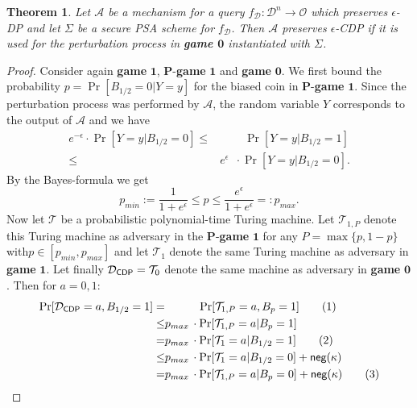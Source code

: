 \documentclass[10pt]{extarticle}
\newcommand\numberthis{\addtocounter{equation}{1}\tag{\theequation}}
\newtheorem{Thm}{Theorem}
\begin{document}
\begin{Thm}\label{cdptheorem} Let $\mathcal{A}$ be a mechanism for a query $f_{\mathcal{D}}:\mathcal{D}^n\to\mathcal{O}$ which preserves $\epsilon$-\mbox{\upshape\sffamily DP} and let $\Sigma$ be a secure PSA scheme for $f_{\mathcal{D}}$. Then $\mathcal{A}$ preserves $\epsilon$-\mbox{\upshape\sffamily CDP} if it is used for the perturbation process in \textbf{\upshape game $\boldsymbol 0$} instantiated with $\Sigma$.
\end{Thm}
\begin{proof} Consider again \textbf{game} $\boldsymbol 1$, $\boldsymbol P$-\textbf{game} $\boldsymbol 1$ and \textbf{game} $\boldsymbol 0$. We first bound the probability $p=\Pr[B_{1/2}=0| Y=y]$ for the biased coin in $\boldsymbol P$-\textbf{game} $\boldsymbol 1$. Since the perturbation process was performed by $\mathcal{A}$, the random variable $Y$ corresponds to the output of $\mathcal{A}$ and we have
\begin{align*} e^{-\epsilon}\cdot\Pr[Y=y| B_{1/2}=0]\leq & \phantom{e^{-\epsilon}\cdot}\,\Pr[Y=y| B_{1/2}=1]\\
\leq & e^\epsilon\,\,\,\cdot\Pr[Y=y| B_{1/2}=0].
\end{align*}
By the Bayes-formula we get
\[p_{min}:=\frac{1}{1+e^\epsilon}\leq p\leq\frac{e^\epsilon}{1+e^\epsilon}=:p_{max}.\]
Now let $\mathcal{T}$ be a probabilistic polynomial-time Turing machine. Let $\mathcal{T}_{1,P}$ denote this Turing machine as adversary in the $\boldsymbol P$-\textbf{game} $\boldsymbol 1$ for any $P=\max\{p,1-p\}$ with\linebreak $p\in[p_{min},p_{max}]$ and let $\mathcal{T}_1$ denote the same Turing machine as adversary in \textbf{game} $\boldsymbol 1$. Let finally $\mathcal{D}_{\mbox{\scriptsize\upshape\sffamily CDP}}=\mathcal{T}_0$ denote the same machine as adversary in \textbf{game} $\boldsymbol 0$. Then for $a=0,1$:
\begin{align*} \Pr[\mathcal{D}_{\mbox{\scriptsize\upshape\sffamily CDP}}=a, B_{1/2}=1]= & \phantom{p_{max}\cdot}\,\,\,\Pr[\mathcal{T}_{1,P}=a, B_p=1]\numberthis\label{eqcdp1}\\
 \leq & p_{max}\,\cdot\Pr[\mathcal{T}_{1,P}=a| B_p=1]\\
 = & p_{max}\,\cdot\Pr[\mathcal{T}_1=a| B_{1/2}=1]\numberthis\label{eqone1}\\
 \leq & p_{max}\,\cdot\Pr[\mathcal{T}_1=a| B_{1/2}=0]+\mbox{\upshape\sffamily neg}(\kappa)\\
 = & p_{max}\,\cdot\Pr[\mathcal{T}_{1,P}=a| B_p=0]+\mbox{\upshape\sffamily neg}(\kappa)\numberthis\label{eqone2}\\

\end{align*}
\end{proof}
\end{document}
